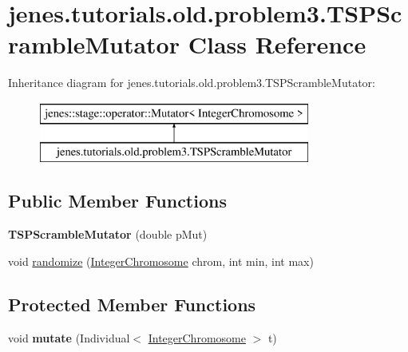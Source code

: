 \hypertarget{classjenes_1_1tutorials_1_1old_1_1problem3_1_1_t_s_p_scramble_mutator}{\section{jenes.\-tutorials.\-old.\-problem3.\-T\-S\-P\-Scramble\-Mutator Class Reference}
\label{classjenes_1_1tutorials_1_1old_1_1problem3_1_1_t_s_p_scramble_mutator}
}
Inheritance diagram for jenes.\-tutorials.\-old.\-problem3.\-T\-S\-P\-Scramble\-Mutator\-:\begin{figure}[H]
\begin{center}
\leavevmode
\includegraphics[height=2.000000cm]{classjenes_1_1tutorials_1_1old_1_1problem3_1_1_t_s_p_scramble_mutator}
\end{center}
\end{figure}
\subsection*{Public Member Functions}
\begin{DoxyCompactItemize}
\item 
\hypertarget{classjenes_1_1tutorials_1_1old_1_1problem3_1_1_t_s_p_scramble_mutator_aca9301f7d3b4b7d7f27e52f462734f49}{{\bfseries T\-S\-P\-Scramble\-Mutator} (double p\-Mut)}\label{classjenes_1_1tutorials_1_1old_1_1problem3_1_1_t_s_p_scramble_mutator_aca9301f7d3b4b7d7f27e52f462734f49}

\item 
void \hyperlink{classjenes_1_1tutorials_1_1old_1_1problem3_1_1_t_s_p_scramble_mutator_aa32403f391bb9ddffb1145b4d852187d}{randomize} (\hyperlink{classjenes_1_1chromosome_1_1_integer_chromosome}{Integer\-Chromosome} chrom, int min, int max)
\end{DoxyCompactItemize}
\subsection*{Protected Member Functions}
\begin{DoxyCompactItemize}
\item 
\hypertarget{classjenes_1_1tutorials_1_1old_1_1problem3_1_1_t_s_p_scramble_mutator_a7c2d7c9d8b465b19e0c4f8da57e299f3}{void {\bfseries mutate} (Individual$<$ \hyperlink{classjenes_1_1chromosome_1_1_integer_chromosome}{Integer\-Chromosome} $>$ t)}\label{classjenes_1_1tutorials_1_1old_1_1problem3_1_1_t_s_p_scramble_mutator_a7c2d7c9d8b465b19e0c4f8da57e299f3}

\end{DoxyCompactItemize}


